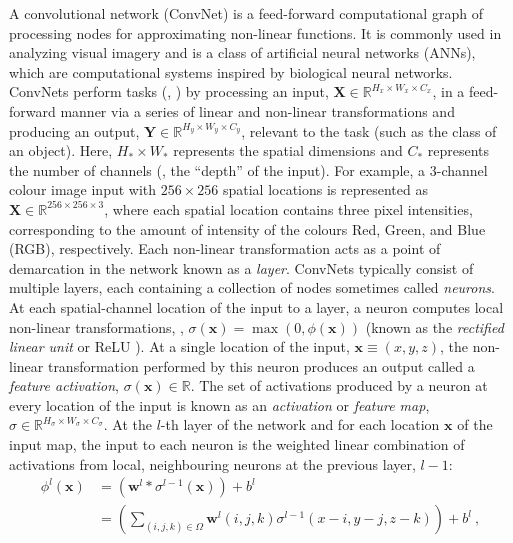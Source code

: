 A convolutional network (ConvNet) is a  feed-forward computational graph of processing nodes for approximating non-linear functions. It is commonly used in analyzing visual imagery and is a class of artificial neural networks (ANNs), which are computational systems inspired by biological neural networks. ConvNets perform tasks (\eg, ) by processing an input, $\mathbf{X} \in \mathbb{R}^{H_x \times W_x \times C_x}$, in a feed-forward manner via a series of linear and non-linear transformations and producing an output, $\mathbf{Y} \in \mathbb{R}^{H_y \times W_y \times C_y}$, relevant to the task (such as the class of an object). Here, $H_\ast \times W_\ast$ represents the spatial dimensions and $C_\ast$ represents the number of channels (\ie, the ``depth'' of the input). For example, a $3$-channel colour image input with $256 \times 256$ spatial locations is represented as $\mathbf{X} \in \mathbb{R}^{256 \times 256 \times 3}$, where each spatial location contains three pixel intensities, corresponding to the amount of intensity of the colours Red, Green, and Blue (RGB), respectively. Each non-linear transformation acts as a point of demarcation in the network known as a \emph{layer}. ConvNets typically consist of multiple layers, each containing a collection of nodes sometimes called \emph{neurons}. At each spatial-channel location of the input to a layer, a neuron computes local non-linear transformations, \eg, $\sigma(\mathbf{x}) = \max{(0, \phi(\mathbf{x}))}$ (known as the \emph{rectified linear unit} or ReLU \cite{nair2010rectified}). At a single location of the input, $\mathbf{x} \equiv (x, y, z)$, the non-linear transformation performed by this neuron produces an output called a \emph{feature activation}, $\sigma(\mathbf{x}) \in \mathbb{R}$. The set of activations produced by a neuron at every location of the input is known as an \emph{activation} or \emph{feature map}, $\sigma \in \mathbb{R}^{H_\sigma \times W_\sigma \times C_\sigma}$. At the $l$-th layer of the network and for each location $\mathbf{x}$ of the input map, the input to each neuron is the weighted linear combination of activations from local, neighbouring neurons at the previous layer, $l-1$:
\begin{equation}
	\begin{aligned}
		\phi^l(\mathbf{x}) &= \left(\mathbf{w}^l * \sigma^{l-1}(\mathbf{x})\right) + b^l\\
		&= \left(\sum_{(i, j, k) \in \Omega} \mathbf{w}^l(i, j, k) \sigma^{l-1}(x - i, y - j, z - k)\right) + b^l\ ,
	\end{aligned}
\end{equation}
